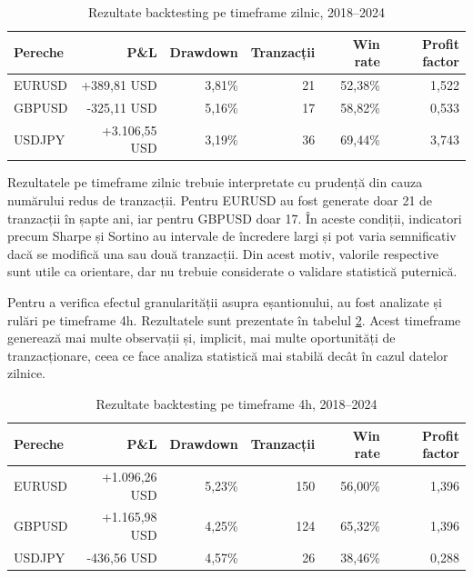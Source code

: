 \begin{table}[htbp]
    \centering
    \begin{tabular}{|l|r|r|r|r|r|}
        \hline
        \textbf{Pereche} & \textbf{P\&L} & \textbf{Drawdown} & \textbf{Tranzacții} & \textbf{Win rate} & \textbf{Profit factor} \\
        \hline
        EURUSD & +389,81 USD & 3,81\% & 21 & 52,38\% & 1,522 \\
        GBPUSD & -325,11 USD & 5,16\% & 17 & 58,82\% & 0,533 \\
        USDJPY & +3.106,55 USD & 3,19\% & 36 & 69,44\% & 3,743 \\
        \hline
    \end{tabular}
    \caption{Rezultate backtesting pe timeframe zilnic, 2018--2024}
    \label{tabel:rezultate_backtest}
\end{table}

Rezultatele pe timeframe zilnic trebuie interpretate cu prudență din cauza numărului redus de tranzacții. Pentru EURUSD au fost generate doar 21 de tranzacții în șapte ani, iar pentru GBPUSD doar 17. În aceste condiții, indicatori precum Sharpe și Sortino au intervale de încredere largi și pot varia semnificativ dacă se modifică una sau două tranzacții. Din acest motiv, valorile respective sunt utile ca orientare, dar nu trebuie considerate o validare statistică puternică.

Pentru a verifica efectul granularității asupra eșantionului, au fost analizate și rulări pe timeframe 4h. Rezultatele sunt prezentate în tabelul \ref{tabel:rezultate_backtest_4h}. Acest timeframe generează mai multe observații și, implicit, mai multe oportunități de tranzacționare, ceea ce face analiza statistică mai stabilă decât în cazul datelor zilnice.

\begin{table}[H]
    \centering
    \small
    \setlength{\tabcolsep}{4pt}
    \begin{tabular}{|l|r|r|r|r|r|}
        \hline
        \textbf{Pereche} & \textbf{P\&L} & \textbf{Drawdown} & \textbf{Tranzacții} & \textbf{Win rate} & \textbf{Profit factor} \\
        \hline
        EURUSD & +1.096,26 USD & 5,23\% & 150 & 56,00\% & 1,396 \\
        GBPUSD & +1.165,98 USD & 4,25\% & 124 & 65,32\% & 1,396 \\
        USDJPY & -436,56 USD & 4,57\% & 26 & 38,46\% & 0,288 \\
        \hline
    \end{tabular}
    \caption{Rezultate backtesting pe timeframe 4h, 2018--2024}
    \label{tabel:rezultate_backtest_4h}
\end{table}


